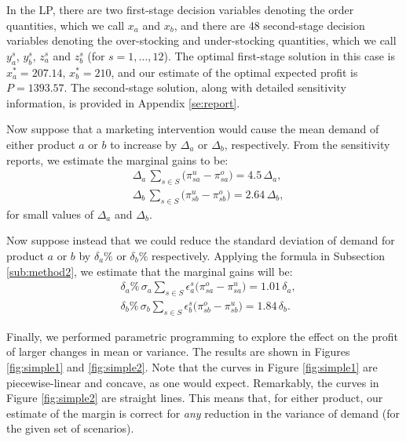 \documentclass[a4paper,11pt]{article}
\begin{document}
In the LP, there are two first-stage decision variables denoting the order quantities, which we call $x_a$ and $x_b$, and there are 48 second-stage decision variables denoting the over-stocking and under-stocking quantities, which we call $y_a^s$, $y_b^s$, $z_a^s$ and $z_b^s$ (for $s = 1, \ldots, 12$). The optimal first-stage solution in this case is $x_a^*=207.14$, $x_b^*=210$, and our estimate of the optimal expected profit is $P=1393.57$. The second-stage solution, along with detailed sensitivity information, is provided in Appendix \ref{se:report}.

Now suppose that a marketing intervention would cause the mean demand of either product $a$ or $b$ to increase by $\Delta_a$ or $\Delta_b$, respectively. From the sensitivity reports, we estimate the marginal gains to be:
\[
\begin{aligned}
    &\Delta_a \, \sum_{s \in S} \big( \pi_{sa}^u - \pi_{sa}^o \big) = 4.5 \, \Delta_a,\\
    &\Delta_b \, \sum_{s \in S} \big( \pi_{sb}^u - \pi_{sb}^o \big) = 2.64 \, \Delta_b,
\end{aligned}
\]
for small values of $\Delta_a$ and $\Delta_b$.

Now suppose instead that we could reduce the standard deviation of demand for product $a$ or $b$ by $\delta_a \%$ or $\delta_b \%$ respectively. Applying the formula in Subsection \ref{sub:method2}, we estimate that the marginal gains will be:
\[
\begin{aligned}
    &\delta_a \% \, \sigma_a     \sum_{s \in S} \epsilon_a^s \big(\pi_{sa}^o - \pi_{sa}^u \big) = 1.01 \, \delta_a,\\
    &\delta_b \% \, \sigma_b     \sum_{s \in S} \epsilon_b^s \big(\pi_{sb}^o - \pi_{sb}^u \big) = 1.84 \, \delta_b.
\end{aligned}
\]

Finally, we performed parametric programming to explore the effect on the profit of larger changes in mean or variance. The results are shown in Figures \ref{fig:simple1} and 
\ref{fig:simple2}. Note that the curves in Figure \ref{fig:simple1} are piecewise-linear and concave, as one would expect. Remarkably, the curves in Figure \ref{fig:simple2} are straight lines. This means that, for either product, our estimate of the margin is correct for \emph{any} reduction in the variance of demand (for the given set of scenarios).
\end{document}
